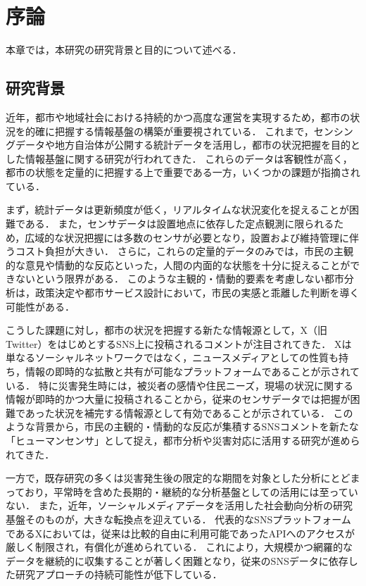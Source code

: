 \chapter{序論}
本章では，本研究の研究背景と目的について述べる．

\section{研究背景}
近年，都市や地域社会における持続的かつ高度な運営を実現するため，都市の状況を的確に把握する情報基盤の構築が重要視されている\cite{smart_city_guide_book, Batty2012}．
これまで，センシングデータや地方自治体が公開する統計データを活用し，都市の状況把握を目的とした情報基盤に関する研究が行われてきた\cite{shinoda2024cds}．
これらのデータは客観性が高く，都市の状態を定量的に把握する上で重要である一方，いくつかの課題が指摘されている．

まず，統計データは更新頻度が低く，リアルタイムな状況変化を捉えることが困難である．
また，センサデータは設置地点に依存した定点観測に限られるため，広域的な状況把握には多数のセンサが必要となり，設置および維持管理に伴うコスト負担が大きい\cite{Hancke2013}．
さらに，これらの定量的データのみでは，市民の主観的な意見や情動的な反応といった，人間の内面的な状態を十分に捉えることができないという限界がある．
このような主観的・情動的要素を考慮しない都市分析は，政策決定や都市サービス設計において，市民の実感と乖離した判断を導く可能性がある．

こうした課題に対し，都市の状況を把握する新たな情報源として，X（旧Twitter）をはじめとするSNS上に投稿されるコメントが注目されてきた\cite{seki2022deim}．
Xは単なるソーシャルネットワークではなく，ニュースメディアとしての性質も持ち，情報の即時的な拡散と共有が可能なプラットフォームであることが示されている\cite{kwak2010twitter}．
特に災害発生時には，被災者の感情や住民ニーズ，現場の状況に関する情報が即時的かつ大量に投稿されることから，従来のセンサデータでは把握が困難であった状況を補完する情報源として有効であることが示されている．
このような背景から，市民の主観的・情動的な反応が集積するSNSコメントを新たな「ヒューマンセンサ」\cite{human_sensing}として捉え，都市分析や災害対応に活用する研究が進められてきた．

一方で，既存研究の多くは災害発生後の限定的な期間を対象とした分析にとどまっており，平常時を含めた長期的・継続的な分析基盤としての活用には至っていない．
また，近年，ソーシャルメディアデータを活用した社会動向分析の研究基盤そのものが，大きな転換点を迎えている．
代表的なSNSプラットフォームであるXにおいては，従来は比較的自由に利用可能であったAPIへのアクセスが厳しく制限され，有償化が進められている\cite{x-api-v2}．
これにより，大規模かつ網羅的なデータを継続的に収集することが著しく困難となり，従来のSNSデータに依存した研究アプローチの持続可能性が低下している．

